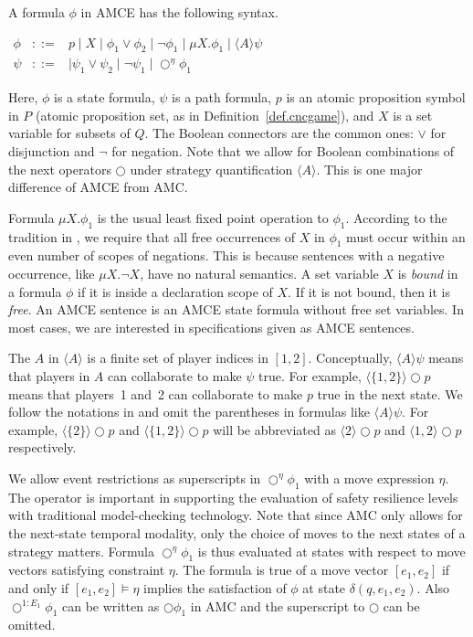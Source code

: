 \documentclass[times,10pt,twocolumn]{article}
\newcommand{\nxt}{\bigcirc}
\begin{document}
 
A formula $\phi$ in AMCE has the following syntax. 
\begin{center} 
$\begin{array}{rrl} 
\phi	& ::= & p 
	\mid X 
	\mid \phi_1 \vee \phi_2
	\mid \neg \phi_1 
 	\mid \mu X.\phi_1 
 	\mid \langle A\rangle \psi\\ 
\psi	& ::= &
	\mid \psi_1 \vee \psi_2
	\mid \neg \psi_1 
 	\mid \nxt^\eta \phi_1
\end{array}$ 
\end{center} 
Here, $\phi$ is a state formula, $\psi$ is a path formula,  
$p$ is an atomic proposition symbol in $P$ 
(atomic proposition set, as in Definition~\ref{def.cncgame})\label{reply1.P.x}, 
and 
$X$ is a set variable for subsets of $Q$.
The Boolean connectors are the common ones: $\vee$ for disjunction and 
$\neg$ for negation.
Note that we allow for Boolean combinations of the next operators $\nxt$ 
under strategy quantification  $\langle A\rangle$.  
This is one major difference of AMCE from AMC.  

Formula $\mu X.\phi_1$ is the usual least fixed point operation to $\phi_1$.
According to the tradition in \cite{AHK02}, 
we require that all free occurrences of $X$ in $\phi_1$ must occur
within an even number of scopes of negations.    
This is because sentences with a negative occurrence, like $\mu X. \neg X$, have no natural semantics.
A set variable $X$ is {\em bound} in a formula $\phi$ if it is inside a declaration scope of $X$.  
If it is not bound, then it is {\em free}.  
An AMCE sentence is an AMCE state formula without free set variables. 
In most cases, we are interested in specifications given as AMCE sentences.  


The $A$ in $\langle A \rangle$ is a finite set of player indices 
in $[1,2]$.
Conceptually, $\langle A \rangle\psi$ means that players in $A$ can collaborate 
to make $\psi$ true. 
For example, $\langle \{1,2\}\rangle\nxt p$ means that 
players~1 and~2 can collaborate to make $p$ true in the next state. 
We follow the notations in \cite{AHK02} and omit the parentheses in 
formulas like $\langle A\rangle \psi$.  
For example, $\langle \{2\}\rangle \nxt p$ 
and $\langle \{1,2\}\rangle \nxt p$ 
will be abbreviated as 
$\langle 2\rangle \nxt p$ and   
$\langle 1,2\rangle \nxt p$ respectively.  

We allow event 
restrictions as superscripts in $\nxt^\eta\phi_1$ 
with a move expression $\eta$.  
The operator is important in supporting the evaluation of safety resilience levels with traditional model-checking technology.  
Note that since AMC \cite{AHK02} only allows for the next-state temporal 
modality, 
only the choice of moves to the next states of a strategy matters.  
Formula $\nxt^\eta\phi_1$ is thus evaluated at states  
with respect to move vectors satisfying constraint $\eta$.  
The formula is true of a move vector $[e_1,e_2]$ if and only if 
$[e_1,e_2]\models \eta$  
implies the satisfaction of $\phi$ at state $\delta(q,e_1,e_2)$. 
Also 
$\nxt^{1:E_1}\phi_1$ can be written as $\nxt\phi_1$ in AMC \cite{AHK02} 
and 
the superscript to $\nxt$ can be omitted.    
\end{document}
